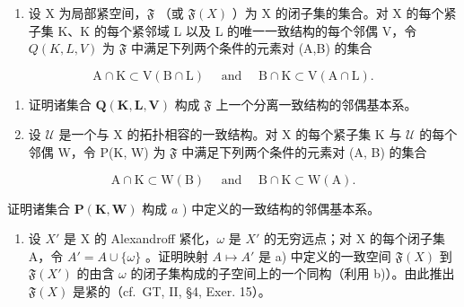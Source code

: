 \exercisesection{}

\begin{enumerate}
\def\labelenumi{\arabic{enumi})}
\tightlist
\item
  设 X 为局部紧空间，\(\mathfrak{F}\) （或 \(\mathfrak{F}(X)\) ）为 X 的闭子集的集合。对 X 的每个紧子集 K、K 的每个紧邻域 L 以及 L 的唯一一致结构的每个邻偶 V，令 \(Q(K,L,V)\) 为 \(\mathfrak{F}\) 中满足下列两个条件的元素对 (A,B) 的集合
\end{enumerate}

\[
\mathrm{A} \cap \mathrm{K} \subset \mathrm{V} (\mathrm{B} \cap \mathrm{L}) \quad \text { and } \quad \mathrm{B} \cap \mathrm{K} \subset \mathrm{V} (\mathrm{A} \cap \mathrm{L}).
\]

\begin{enumerate}
\def\labelenumi{\alph{enumi})}
\item
  证明诸集合 \(\mathbf{Q}(\mathbf{K},\mathbf{L},\mathbf{V})\) 构成 \(\mathfrak{F}\) 上一个分离一致结构的邻偶基本系。
\item
  设 \(\mathcal{U}\) 是一个与 X 的拓扑相容的一致结构。对 X 的每个紧子集 K 与 \(\mathcal{U}\) 的每个邻偶 W，令 P(K, W) 为 \(\mathfrak{F}\) 中满足下列两个条件的元素对 (A, B) 的集合
\end{enumerate}

\[
\mathrm{A} \cap \mathrm{K} \subset \mathrm{W} (\mathrm{B}) \quad \text { and } \quad \mathrm{B} \cap \mathrm{K} \subset \mathrm{W} (\mathrm{A}).
\]

证明诸集合 \(\mathbf{P}(\mathbf{K},\mathbf{W})\) 构成 \(a\) ) 中定义的一致结构的邻偶基本系。

\begin{enumerate}
\def\labelenumi{\alph{enumi})}
\setcounter{enumi}{2}
\tightlist
\item
  设 \(X'\) 是 X 的 Alexandroff 紧化，\(\omega\) 是 \(X'\) 的无穷远点；对 X 的每个闭子集 A，令 \(A' = A \cup \{\omega\}\) 。证明映射 \(A \mapsto A'\) 是 a) 中定义的一致空间 \(\mathfrak{F}(X)\) 到 \(\mathfrak{F}(X')\) 的由含 \(\omega\) 的闭子集构成的子空间上的一个同构（利用 b)）。由此推出 \(\mathfrak{F}(X)\) 是紧的（cf.~GT, II, §4, Exer. 15）。
\end{enumerate}

